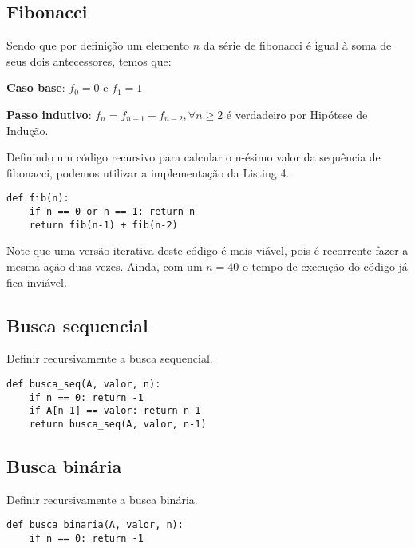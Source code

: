 \documentclass[a4paper, twocolumn]{article}
\theoremstyle{definition}
\begin{document}
\subsection{Fibonacci}
Sendo que por definição um elemento $n$ da série de fibonacci é igual à soma de seus dois antecessores, temos que:

\textbf{Caso base}: $f_0 = 0$ e $f_1 = 1$

\textbf{Passo indutivo}: $f_n = f_{n-1} + f_{n-2}, \forall n \geq 2$ é verdadeiro por Hipótese de Indução.

Definindo um código recursivo para calcular o n-ésimo valor da sequência de fibonacci, podemos utilizar a implementação da Listing 4.

\begin{lstlisting}[label=fibonacci,caption= Fionacci recursivo]
def fib(n):
	if n == 0 or n == 1: return n
	return fib(n-1) + fib(n-2)
\end{lstlisting}

Note que uma versão iterativa deste código é mais viável, pois é recorrente fazer a mesma ação duas vezes. Ainda, com um $n=40$ o tempo de execução do código já fica inviável.

\subsection{Busca sequencial}
Definir recursivamente a busca sequencial.

\begin{lstlisting}[label=busca_seqa,caption= Busca sequencial recursiva]
def busca_seq(A, valor, n):
	if n == 0: return -1
	if A[n-1] == valor: return n-1
	return busca_seq(A, valor, n-1)
\end{lstlisting}

\subsection{Busca binária}
Definir recursivamente a busca binária.

\begin{lstlisting}[label=busca_binaria,caption= Busca binária recursiva]
def busca_binaria(A, valor, n):
	if n == 0: return -1
	
\end{lstlisting}
\end{document}
